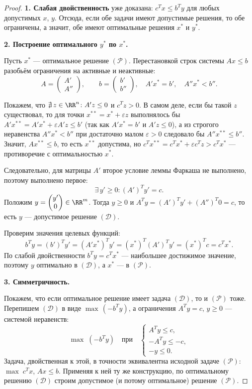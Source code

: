\begin{proof}
	\textbf{1. Слабая двойственность} уже доказана: $c^T x \le b^T y$ для любых допустимых $x$, $y$. Отсюда, если обе задачи имеют допустимые решения, то обе ограничены, а значит, обе имеют оптимальные решения $x^*$ и $y^*$.
	
	\textbf{2. Построение оптимального $y^*$ по $x^*$.}
	
	Пусть $x^*$ --- оптимальное решение $(\mathcal{P})$. Перестановкой строк системы $Ax \le b$ разобьём ограничения на активные и неактивные:
	\[
	A = \begin{pmatrix} A' \\ A'' \end{pmatrix},
	\qquad
	b = \begin{pmatrix} b' \\ b'' \end{pmatrix},
	\quad
	A'x^* = b',\quad A''x^* < b''.
	\]
	
	Покажем, что $\nexists\, z \in \RR^n \colon A'z \le 0$ и $c^T z > 0$. В самом деле, если бы такой $z$ существовал, то для точки $x^{**} = x^* + \varepsilon z$ выполнялось бы $A'x^{**} = A'x^* + \varepsilon A'z \le b'$ (так как $A'x^* = b'$ и $A'z \le 0$), а из строгого неравенства $A''x^* < b''$ при достаточно малом $\varepsilon > 0$ следовало бы $A''x^{**} \le b''$. Значит, $Ax^{**} \le b$, то есть $x^{**}$ допустима, но $c^T x^{**} = c^T x^* + \varepsilon c^T z > c^T x^*$ --- противоречие с оптимальностью $x^*$.
	
	Следовательно, для матрицы $A'$ второе условие леммы Фаркаша не выполнено, поэтому выполнено первое:
	\[
	\exists\, y' \ge 0\colon (A')^T y' = c.
	\]
	Положим $y = \begin{pmatrix} y' \\ 0 \end{pmatrix} \in \RR^m$. Тогда $y \ge 0$ и $A^T y = (A')^T y' + (A'')^T 0 = c$, то есть $y$ --- допустимое решение $(\mathcal{D})$.
	
	Проверим значения целевых функций:
	\[
	b^T y = (b')^T y' = (A'x^*)^T y' = (x^*)^T (A')^T y' = (x^*)^T c = c^T x^*.
	\]
	По слабой двойственности $b^T y = c^T x^*$ --- наибольшее достижимое значение, поэтому $y$ оптимально в $(\mathcal{D})$, а $x^*$ --- в $(\mathcal{P})$.
	
	\textbf{3. Симметричность.}
	
	Покажем, что если оптимальное решение имеет задача $(\mathcal{D})$, то и $(\mathcal{P})$ тоже. Перепишем $(\mathcal{D})$ в виде $\max\,(-b^T y)$, а ограничения $A^T y = c$, $y \ge 0$ --- системой неравенств:
	\[
	\max\; (-b^T y)
	\quad \text{при} \quad
	\begin{cases}
		A^T y \le c,\\
		-A^T y \le -c,\\
		-y \le 0.
	\end{cases}
	\]
	Задача, двойственная к этой, в точности эквивалентна исходной задаче $(\mathcal{P})$: $\max\; c^T x$, $Ax \le b$. Применяя к ней ту же конструкцию, по оптимальному решению $(\mathcal{D})$ строим допустимое (и потому оптимальное) решение $(\mathcal{P})$.
\end{proof}

